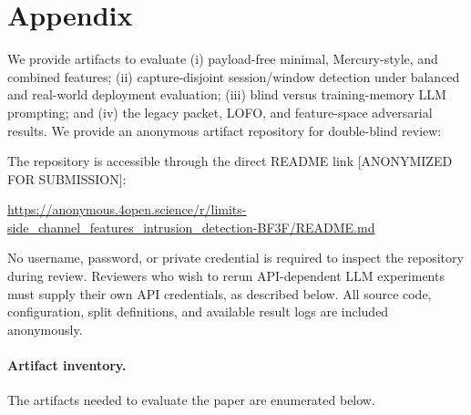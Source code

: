 \documentclass[letterpaper,twocolumn,10pt]{article}
\begin{document}



\section*{Appendix}
\label{appendix}

We provide artifacts to evaluate (i) payload-free minimal, Mercury-style, and combined features; (ii) capture-disjoint session/window detection under balanced and real-world deployment evaluation; (iii) blind versus training-memory LLM prompting; and (iv) the legacy packet, LOFO, and feature-space adversarial results. We provide an anonymous artifact repository for double-blind review:

The repository is accessible through the direct README link [ANONYMIZED FOR SUBMISSION]:
\begin{center}
\url{https://anonymous.4open.science/r/limits-side_channel_features_intrusion_detection-BF3F/README.md}
\end{center}

No username, password, or private credential is required to inspect the repository during review. Reviewers who wish to rerun API-dependent LLM experiments must supply their own API credentials, as described below. All source code, configuration, split definitions, and available result logs are included anonymously.

\paragraph{Artifact inventory.}
The artifacts needed to evaluate the paper are enumerated below.
\end{document}
